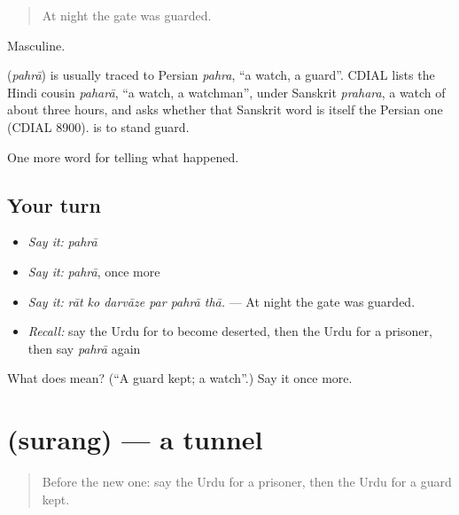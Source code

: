 \begin{quote}
At night the gate was guarded.
\end{quote}

Masculine.

\begin{cousinweb}
\textbf{} (\emph{pahrā}) is usually traced to Persian \emph{pahra}, \textquotedblleft{}a watch, a guard\textquotedblright{}. CDIAL lists the Hindi cousin \emph{paharā}, \textquotedblleft{}a watch, a watchman\textquotedblright{}, under Sanskrit \emph{prahara}, a watch of about three hours, and asks whether that Sanskrit word is itself the Persian one (CDIAL 8900). \textbf{ } is to stand guard.
\end{cousinweb}

\begin{grammarlens}[title={What you've built}]
One more word for telling what happened.
\end{grammarlens}

\subsection*{Your turn}
\begin{itemize}
\raggedright
  \item \emph{Say it:} \emph{pahrā}
  \item \emph{Say it:} \emph{pahrā}, once more
  \item \emph{Say it:} \emph{rāt ko darvāze par pahrā thā.} — At night the gate was guarded.
  \item \emph{Recall:} say the Urdu for to become deserted, then the Urdu for a prisoner, then say \emph{pahrā} again
\end{itemize}

\begin{tcolorbox}[breakable,colback=teal!4,colframe=teal!35!black,title={Before you move on}]
What does  mean? (\textquotedblleft{}A guard kept; a watch\textquotedblright{}.) Say it once more.
\end{tcolorbox}
\section[\texorpdfstring{\ur{سرنگ} (surang)}{سرنگ (surang)}]{ (surang) — a tunnel}

\label{lesson:UR-C316-surang}



\begin{quote}
Before the new one: say the Urdu for a prisoner, then the Urdu for a guard kept.
\end{quote}

